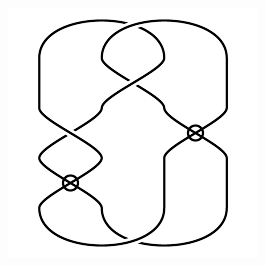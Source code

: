 \begin{figure}[H]
\begin{minipage}[b]{.18\linewidth}
\end{minipage}
\begin{minipage}[b]{.18\linewidth}
\centering
\includegraphics[width=\linewidth]{../data/virtual_4_86.png}
\end{minipage}
\end{figure}

